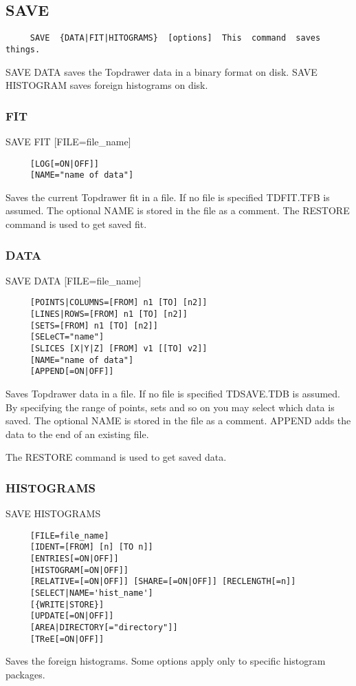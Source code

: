 \subsection{SAVE}
\begin{verbatim}
     SAVE  {DATA|FIT|HITOGRAMS}  [options]  This  command  saves  things.
\end{verbatim}
SAVE DATA  saves  the  Topdrawer  data  in  a  binary  format  on   disk.
SAVE HISTOGRAM saves foreign histograms on disk.  
\subsubsection{FIT}
SAVE FIT [FILE=file\_name] 
\begin{verbatim}
     [LOG[=ON|OFF]] 
     [NAME="name of data"] 
\end{verbatim}
Saves  the  current  Topdrawer  fit in a file.  If no file is specified
TDFIT.TFB is assumed.  The optional NAME is stored in  the  file  as  a
comment.  The RESTORE command is used to get saved fit.  
\subsubsection{DATA}
SAVE DATA [FILE=file\_name] 
\begin{verbatim}
     [POINTS|COLUMNS=[FROM] n1 [TO] [n2]] 
     [LINES|ROWS=[FROM] n1 [TO] [n2]] 
     [SETS=[FROM] n1 [TO] [n2]] 
     [SELeCT="name"] 
     [SLICES [X|Y|Z] [FROM] v1 [[TO] v2]] 
     [NAME="name of data"] 
     [APPEND[=ON|OFF]] 
\end{verbatim}
Saves  Topdrawer data in a file.  If no file is specified TDSAVE.TDB is
assumed.  By specifying the range of points, sets and  so  on  you  may
select which data is saved.  The optional NAME is stored in the file as
a comment.  APPEND adds the data to the end of an existing file.  

The RESTORE command is used to get saved data.  
\subsubsection{HISTOGRAMS}
SAVE HISTOGRAMS 
\begin{verbatim}
     [FILE=file_name] 
     [IDENT=[FROM] [n] [TO n]] 
     [ENTRIES[=ON|OFF]] 
     [HISTOGRAM[=ON|OFF]] 
     [RELATIVE=[=ON|OFF]] [SHARE=[=ON|OFF]] [RECLENGTH[=n]] 
     [SELECT|NAME='hist_name'] 
     [{WRITE|STORE}] 
     [UPDATE[=ON|OFF]] 
     [AREA|DIRECTORY[="directory"]] 
     [TReE[=ON|OFF]] 
\end{verbatim}
Saves  the  foreign  histograms.   Some  options apply only to specific
histogram packages.  
